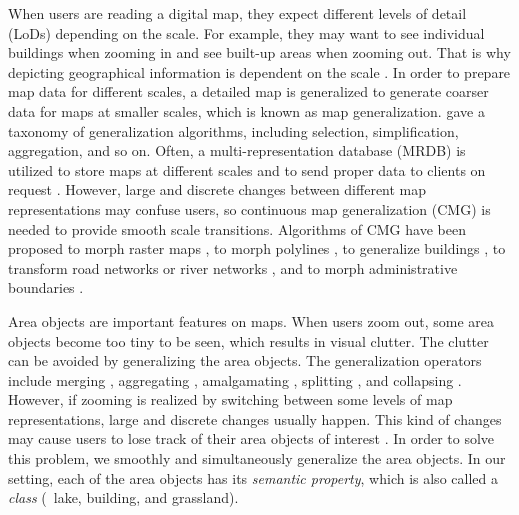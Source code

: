 \documentclass[twocolumn]{svjour3}          %
\begin{document}
When users are reading a digital map,
they expect different levels of detail (LoDs) depending on the scale.
For example, they may want to see individual buildings when zooming in
and see built-up areas when zooming out.
That is why depicting geographical information is dependent on the scale
\citep{Muller1995Generalization,Weibel1997}. 
In order to prepare map data for different scales,
a detailed map is generalized to generate coarser data 
for maps at smaller scales,
which is known as map generalization.
\citet{Mackaness2017Generalization} gave a taxonomy of 
generalization algorithms, 
including selection, simplification, aggregation, and so on.
Often, a multi-representation database (MRDB) is utilized to store
maps at different scales and to send proper data to clients on request
\citep[\eg][]{Hampe2004multiple}.
However, large and discrete changes between different map representations
may confuse users,
so continuous map generalization (CMG) is needed to
provide smooth scale transitions.
Algorithms of CMG have been proposed 
to morph raster maps
\citep[\eg][]{Pantazis2009a,Pantazis2009b}, 
to morph polylines
\citep[\eg][]{Noellenburg2008,Peng2013LSA,Deng2015,Li2017Annealing,Li2018Fourier},
to generalize buildings
\citep[\eg][]{Li2017_Building,Peng2017Building,Touya2017Progressive},
to transform road networks or river networks
\citep[\eg][]{Suba2016Road,Chimani2014Eat,Huang2017Matrix,Peng2012River},
and to morph administrative boundaries
\citep[\eg][]{Peng2016Admin}.






Area objects are important features on maps. 
When users zoom out,
some area objects become too tiny to be seen,
which results in visual clutter.
The clutter can be avoided by generalizing the 
area objects.
The generalization operators include
merging \citep[\eg][]{HaunertWolff2010AreaAgg}, 
aggregating \citep[\eg][]{Shen2019Aggregation}, 
amalgamating \citep[\eg][]{Regnauld2007Amalgamation}, 
splitting \citep[\eg][]{Meijers2016Split}, 
and collapsing \citep[\eg][]{Haunert2008Skeleton}.
However, if zooming is realized by switching between
some levels of map representations, 
large and discrete changes usually happen.
This kind of changes may cause users to lose track of
their area objects of interest \citep{vanKreveld2001}.
In order to solve this problem, 
we smoothly and simultaneously generalize the area objects.
In our setting, each of the area objects has its \emph{semantic property},
which is also called a \emph{class} (\eg\ lake, building, and grassland).
\end{document}
